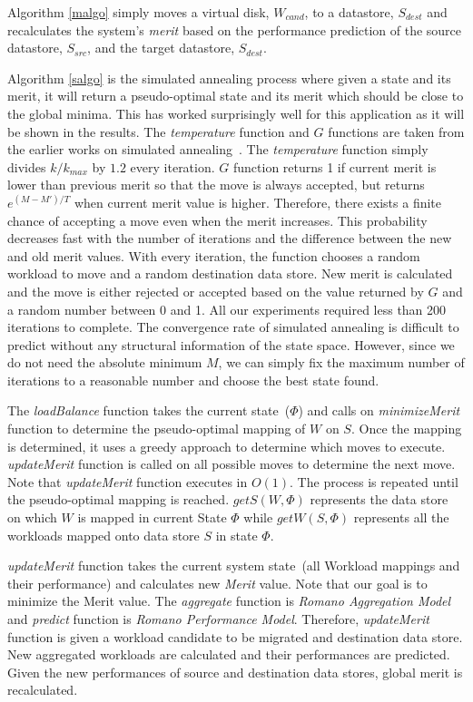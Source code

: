 Algorithm \ref{malgo} simply moves a virtual disk, $W_{cand}$, to a datastore, $S_{dest}$ and recalculates the system's \emph{merit} based on the performance prediction of the source datastore, $S_{src}$, and the target datastore, $S_{dest}$.

Algorithm \ref{salgo} is the simulated annealing process where given a state and its merit, it will return a pseudo-optimal state and its merit which should be close to the global minima.
This has worked surprisingly well for this application as it will be shown in the results. 
The \emph{temperature} function and $G$ functions are taken from the earlier works on simulated annealing~\cite{kirkpatrick:1983}.
The \emph{temperature} function simply divides $k/k_{max}$ by $1.2$ every iteration.
$G$ function returns 1 if current merit is lower than previous merit so that the move is always accepted, but returns $e^{(M-M')/T}$ when current merit value is higher.
Therefore, there exists a finite chance of accepting a move even when the merit increases.
This probability decreases fast with the number of iterations and the difference between the new and old merit values.
With every iteration, the function chooses a random workload to move and a random destination data store.
New merit is calculated and the move is either rejected or accepted based on the value returned by $G$ and a random number between 0 and 1.
All our experiments required less than 200 iterations to complete.
The convergence rate of simulated annealing is difficult to predict without any structural information of the state space.
However, since we do not need the absolute minimum $M$, we can simply fix the maximum number of iterations to a reasonable number and choose the best state found.

The \emph{loadBalance} function takes the current state~($\Phi$) and calls on \emph{minimizeMerit} function to determine the pseudo-optimal mapping of $W$ on $S$.
Once the mapping is determined, it uses a greedy approach to determine which moves to execute. \emph{updateMerit} function is called on all possible moves to determine the next move.
Note that \emph{updateMerit} function executes in $O(1)$.
The process is repeated until the pseudo-optimal mapping is reached.
$getS(W, \Phi)$ represents the data store on which $W$ is mapped in current State $\Phi$ while $getW(S, \Phi)$ represents all the workloads mapped onto data store $S$ in state $\Phi$.

\emph{updateMerit} function takes the current system state~(all Workload mappings and their performance) and calculates new \emph{Merit} value.
Note that our goal is to minimize the Merit value.
The \emph{aggregate} function is \emph{Romano Aggregation Model} and \emph{predict} function is \emph{Romano Performance Model}.
Therefore, \emph{updateMerit} function is given a workload candidate to be migrated and destination data store.
New aggregated workloads are calculated and their performances are predicted.
Given the new performances of source and destination data stores, global merit is recalculated.


